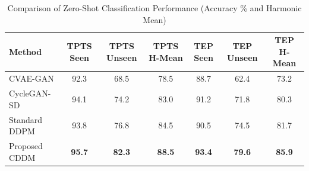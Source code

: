 \begin{table}[t]
\centering
\caption{Comparison of Zero-Shot Classification Performance (Accuracy \% and Harmonic Mean)}
\label{tab:performance}
\begin{tabular}{lcccccc}
\toprule
Method & TPTS Seen & TPTS Unseen & TPTS H-Mean & TEP Seen & TEP Unseen & TEP H-Mean \\
\midrule
CVAE-GAN & 92.3 & 68.5 & 78.5 & 88.7 & 62.4 & 73.2 \\
CycleGAN-SD & 94.1 & 74.2 & 83.0 & 91.2 & 71.8 & 80.3 \\
Standard DDPM & 93.8 & 76.8 & 84.5 & 90.5 & 74.5 & 81.7 \\
Proposed CDDM & \textbf{95.7} & \textbf{82.3} & \textbf{88.5} & \textbf{93.4} & \textbf{79.6} & \textbf{85.9} \\
\bottomrule
\end{tabular}
\end{table}
